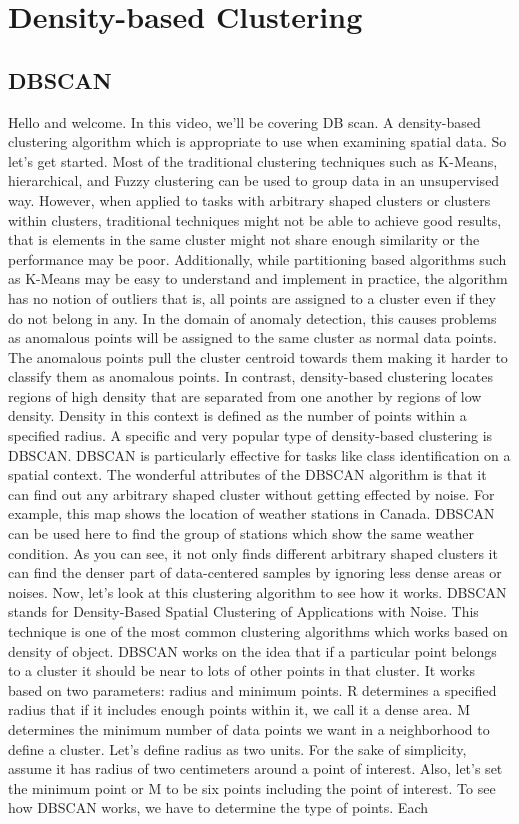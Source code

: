 \section{Density-based Clustering}

\subsection{DBSCAN}

Hello and welcome. In this video, we'll be covering DB scan. A density-based clustering algorithm which is appropriate to use when examining spatial data. So let's get started. Most of the traditional clustering techniques such as K-Means, hierarchical, and Fuzzy clustering can be used to group data in an unsupervised way. However, when applied to tasks with arbitrary shaped clusters or clusters within clusters, traditional techniques might not be able to achieve good results, that is elements in the same cluster might not share enough similarity or the performance may be poor. Additionally, while partitioning based algorithms such as K-Means may be easy to understand and implement in practice, the algorithm has no notion of outliers that is, all points are assigned to a cluster even if they do not belong in any. In the domain of anomaly detection, this causes problems as anomalous points will be assigned to the same cluster as normal data points. The anomalous points pull the cluster centroid towards them making it harder to classify them as anomalous points. In contrast, density-based clustering locates regions of high density that are separated from one another by regions of low density. Density in this context is defined as the number of points within a specified radius. A specific and very popular type of density-based clustering is DBSCAN. DBSCAN is particularly effective for tasks like class identification on a spatial context. The wonderful attributes of the DBSCAN algorithm is that it can find out any arbitrary shaped cluster without getting effected by noise. For example, this map shows the location of weather stations in Canada. DBSCAN can be used here to find the group of stations which show the same weather condition. As you can see, it not only finds different arbitrary shaped clusters it can find the denser part of data-centered samples by ignoring less dense areas or noises. Now, let's look at this clustering algorithm to see how it works. DBSCAN stands for Density-Based Spatial Clustering of Applications with Noise. This technique is one of the most common clustering algorithms which works based on density of object. DBSCAN works on the idea that if a particular point belongs to a cluster it should be near to lots of other points in that cluster. It works based on two parameters: radius and minimum points. R determines a specified radius that if it includes enough points within it, we call it a dense area. M determines the minimum number of data points we want in a neighborhood to define a cluster. Let's define radius as two units. For the sake of simplicity, assume it has radius of two centimeters around a point of interest. Also, let's set the minimum point or M to be six points including the point of interest. To see how DBSCAN works, we have to determine the type of points. Each 